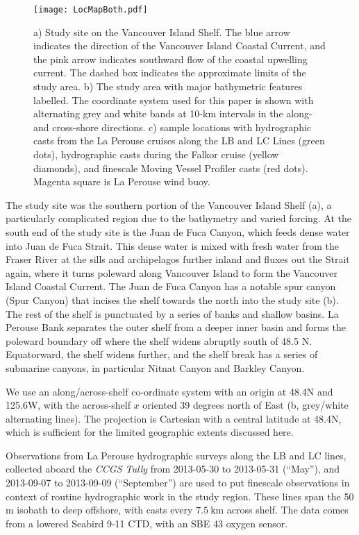 \documentclass[draft]{agujournal2019}
\begin{document}
\begin{figure}[htbp]
  \texttt{[image: LocMapBoth.pdf]}
  \caption{a) Study site on the Vancouver Island Shelf.  The blue arrow indicates the direction of the Vancouver Island Coastal Current, and the pink arrow indicates southward flow of the coastal upwelling current.  The dashed box indicates the approximate limits of the study area.  b) The study area with major bathymetric features labelled.  The coordinate system used for this paper is shown with alternating grey and white bands at 10-km intervals in the along- and cross-shore directions. c) sample locations with hydrographic casts from the La Perouse cruises along the LB and LC Lines (green dots), hydrographic casts during the Falkor cruise (yellow diamonds), and finescale Moving Vessel Profiler casts (red dots).  Magenta
  square is La Perouse wind buoy.}
  \label{fig:LocMapBoth}
\end{figure}

The study site was the southern portion of the Vancouver Island Shelf (a), a particularly complicated region due to the bathymetry and varied forcing.  At the south end of the study site is the Juan de Fuca Canyon, which feeds dense water into Juan de Fuca Strait.  This dense water is mixed with fresh water from the Fraser River at the sills and archipelagos further inland and fluxes out the Strait again, where it turns poleward along Vancouver Island to form the Vancouver Island Coastal Current.  The Juan de Fuca Canyon has a notable spur canyon (Spur Canyon) that incises the shelf towards the north into the study site (b).  The rest of the shelf is punctuated by a series of banks and shallow basins.  La Perouse Bank  separates the outer shelf from a deeper inner basin and forms the poleward boundary off where the shelf widens abruptly south of 48.5 N. Equatorward, the shelf widens further, and the shelf break has a series of submarine canyons, in particular Nitnat Canyon and Barkley Canyon.

We use an along/across-shelf co-ordinate system with an origin at
48.4\textdegree N and 125.6\textdegree W, with the across-shelf $x$ oriented 39 degrees north of East (b, grey/white alternating lines).  The projection is Cartesian with a central latitude at 48.4\textdegree N, which is sufficient for the limited geographic extents discussed here.

Observations from La Perouse hydrographic surveys along the LB and LC lines, collected aboard the \emph{CCGS Tully} from 2013-05-30 to 2013-05-31  (``May''), and 2013-09-07 to 2013-09-09 (``September'') are used to put finescale observations in context of routine hydrographic work in the study region.  These lines span the 50 m isobath to deep offshore, with casts every $7.5\ \mathrm{km}$ across shelf. The data comes from a lowered Seabird 9-11 CTD, with an SBE 43 oxygen sensor.
\end{document}

